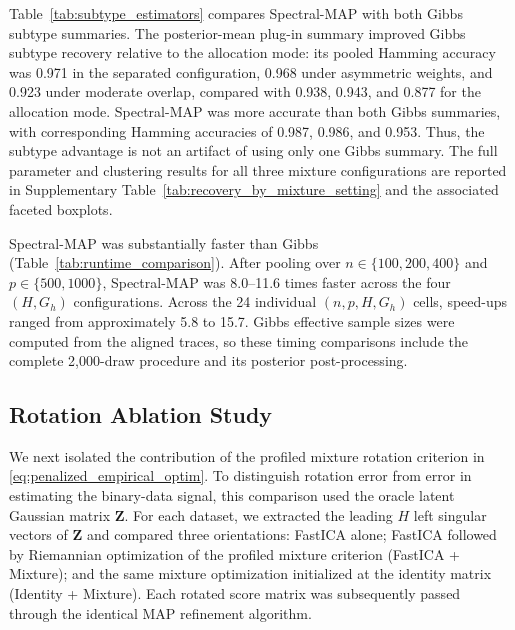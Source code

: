 Table~\ref{tab:subtype_estimators} compares Spectral-MAP with both Gibbs
subtype summaries. The posterior-mean plug-in summary improved Gibbs subtype
recovery relative to the allocation mode: its pooled Hamming accuracy was
0.971 in the separated configuration, 0.968 under asymmetric weights, and
0.923 under moderate overlap, compared with 0.938, 0.943, and 0.877 for the
allocation mode. Spectral-MAP was more accurate than both Gibbs summaries,
with corresponding Hamming accuracies of 0.987, 0.986, and 0.953. Thus, the
subtype advantage is not an artifact of using only one Gibbs summary. The
full parameter and clustering results for all three mixture configurations
are reported in Supplementary Table~\ref{tab:recovery_by_mixture_setting} and
the associated faceted boxplots.



Spectral-MAP was substantially faster than Gibbs (Table~\ref{tab:runtime_comparison}).
After pooling over $n\in\{100,200,400\}$ and $p\in\{500,1000\}$,
Spectral-MAP was 8.0--11.6 times faster across the four $(H,G_h)$
configurations. Across the 24 individual $(n,p,H,G_h)$ cells, speed-ups ranged
from approximately 5.8 to 15.7. Gibbs effective sample sizes were computed
from the aligned traces, so these timing comparisons include the complete
2,000-draw procedure and its posterior post-processing.



\subsection{Rotation Ablation Study}
\label{sec:rotation_ablation}

We next isolated the contribution of the profiled mixture rotation criterion
in \eqref{eq:penalized_empirical_optim}. To distinguish rotation error from
error in estimating the binary-data signal, this comparison used the oracle
latent Gaussian matrix $\boldsymbol Z$. For each dataset, we extracted the
leading $H$ left singular vectors of $\boldsymbol Z$ and compared three
orientations: FastICA alone; FastICA followed by Riemannian optimization of
the profiled mixture criterion (FastICA + Mixture); and the same mixture
optimization initialized at the identity matrix (Identity + Mixture). Each
rotated score matrix was subsequently passed through the identical MAP
refinement algorithm.

